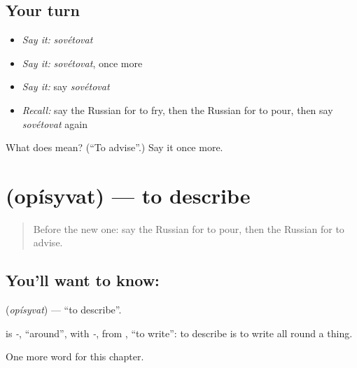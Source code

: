 \subsection*{Your turn}
\begin{itemize}
\raggedright
  \item \emph{Say it:} \emph{sovétovat}
  \item \emph{Say it:} \emph{sovétovat}, once more
  \item \emph{Say it:} say \emph{sovétovat}
  \item \emph{Recall:} say the Russian for to fry, then the Russian for to pour, then say \emph{sovétovat} again
\end{itemize}

\begin{tcolorbox}[breakable,colback=teal!4,colframe=teal!35!black,title={Before you move on}]
What does  mean? (\textquotedblleft{}To advise\textquotedblright{}.) Say it once more.
\end{tcolorbox}
\section[\texorpdfstring{\ru{описывать} (opísyvat)}{описывать (opísyvat)}]{ (opísyvat) — to describe}

\label{lesson:RU-C174-opisyvat}



\begin{quote}
Before the new one: say the Russian for to pour, then the Russian for to advise.
\end{quote}

\subsection*{You'll want to know: }
\textbf{} (\emph{opísyvat}) — \textquotedblleft{}to describe\textquotedblright{}.

\begin{cousinweb}
\textbf{} is \emph{-}, \textquotedblleft{}around\textquotedblright{}, with \emph{-}, from \emph{}, \textquotedblleft{}to write\textquotedblright{}: to describe is to write all round a thing.
\end{cousinweb}

\begin{grammarlens}[title={What you've built}]
One more word for this chapter.
\end{grammarlens}

